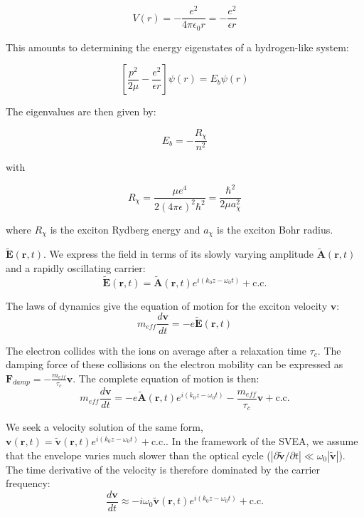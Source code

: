 \documentclass[11pt,a4paper]{article}
\begin{document}
$$V(r) = -\frac{e^2}{4\pi\epsilon_0 r} = -\frac{e^2}{\epsilon r}$$

This amounts to determining the energy eigenstates of a hydrogen-like system:

$$\left[\frac{p^2}{2\mu} - \frac{e^2}{\epsilon r}\right] \psi(r) = E_b \psi(r)$$

The eigenvalues are then given by:


$$E_b = -\frac{R_\chi}{n^2}$$


with


$$R_\chi = \frac{\mu e^4}{2(4\pi\epsilon)^2\hbar^2} = \frac{\hbar^2}{2\mu a_\chi^2}$$

where $R_\chi$ is the exciton Rydberg energy and $a_\chi$ is the exciton Bohr radius.







$\tilde{\mathbf{E}}(\mathbf{r},t)$. We express the field in terms of its slowly varying amplitude $\tilde{\mathbf{A}}(\mathbf{r},t)$ and a rapidly oscillating carrier:
\begin{equation*}
\tilde{\mathbf{E}}(\mathbf{r},t) = \tilde{\mathbf{A}}(\mathbf{r},t) e^{i(k_0z-\omega_0t)} + \text{c.c.}
\end{equation*}

The laws of dynamics give the equation of motion for the exciton velocity $\mathbf{v}$:
\begin{equation*}
m_{eff} \frac{d\mathbf{v}}{dt} = -e\tilde{\mathbf{E}}(\mathbf{r},t)
\end{equation*}

The electron collides with the ions on average after a relaxation time $\tau_c$. The damping force of these collisions on the electron mobility can be expressed as $\mathbf{F}_{damp}=-\frac{m_{eff}}{\tau_c}\mathbf{v}$. The complete equation of motion is then:
\begin{equation*}
m_{eff} \frac{d\mathbf{v}}{dt} = -e\tilde{\mathbf{A}}(\mathbf{r},t) e^{i(k_0z-\omega_0t)} - \frac{m_{eff}}{\tau_c}\mathbf{v} + \text{c.c.}
\end{equation*}

We seek a velocity solution of the same form, $\mathbf{v}(\mathbf{r},t) = \tilde{\mathbf{v}}(\mathbf{r},t) e^{i(k_0z-\omega_0t)} + \text{c.c.}$. 
In the framework of the SVEA, we assume that the envelope varies much slower than the optical cycle ($\left| \partial \tilde{\mathbf{v}} / \partial t \right| \ll \omega_0 |\tilde{\mathbf{v}}|$). The time derivative of the velocity is therefore dominated by the carrier frequency:
\begin{equation*}
\frac{d\mathbf{v}}{dt} \approx -i\omega_0 \tilde{\mathbf{v}}(\mathbf{r},t) e^{i(k_0z-\omega_0t)} + \text{c.c.}
\end{equation*}
\end{document}
